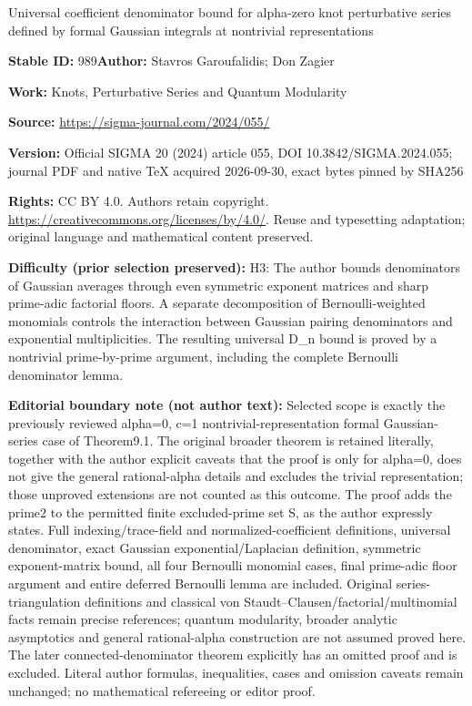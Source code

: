 \documentclass[11pt]{article}
\numberwithin{equation}{section}
\numberwithin{equation}{section}
\begin{document}
\begin{center}\Large Universal coefficient denominator bound for alpha-zero knot perturbative series defined by formal Gaussian integrals at nontrivial representations\end{center}
\noindent\textbf{Stable ID:} 989\quad\textbf{Author:} Stavros Garoufalidis; Don Zagier\par
\noindent\textbf{Work:} Knots, Perturbative Series and Quantum Modularity\par
\noindent\textbf{Source:} \url{https://sigma-journal.com/2024/055/}\par
\noindent\textbf{Version:} Official SIGMA 20 (2024) article 055, DOI 10.3842/SIGMA.2024.055; journal PDF and native TeX acquired 2026-09-30, exact bytes pinned by SHA256\par
\noindent\textbf{Rights:} CC BY 4.0. Authors retain copyright. \url{https://creativecommons.org/licenses/by/4.0/}. Reuse and typesetting adaptation; original language and mathematical content preserved.\par
\noindent\textbf{Difficulty (prior selection preserved):} {\CJKfont H3: The author bounds denominators of Gaussian averages through even symmetric exponent matrices and sharp prime-adic factorial floors. A separate decomposition of Bernoulli-weighted monomials controls the interaction between Gaussian pairing denominators and exponential multiplicities. The resulting universal D\_n bound is proved by a nontrivial prime-by-prime argument, including the complete Bernoulli denominator lemma.}\par
\medskip\noindent\textbf{Editorial boundary note (not author text):} Selected scope is exactly the previously reviewed alpha=0, c=1 nontrivial-representation formal Gaussian-series case of Theorem9.1. The original broader theorem is retained literally, together with the author explicit caveats that the proof is only for alpha=0, does not give the general rational-alpha details and excludes the trivial representation; those unproved extensions are not counted as this outcome. The proof adds the prime2 to the permitted finite excluded-prime set S, as the author expressly states. Full indexing/trace-field and normalized-coefficient definitions, universal denominator, exact Gaussian exponential/Laplacian definition, symmetric exponent-matrix bound, all four Bernoulli monomial cases, final prime-adic floor argument and entire deferred Bernoulli lemma are included. Original series-triangulation definitions and classical von Staudt–Clausen/factorial/multinomial facts remain precise references; quantum modularity, broader analytic asymptotics and general rational-alpha construction are not assumed proved here. The later connected-denominator theorem explicitly has an omitted proof and is excluded. Literal author formulas, inequalities, cases and omission caveats remain unchanged; no mathematical refereeing or editor proof.\par
\end{document}

